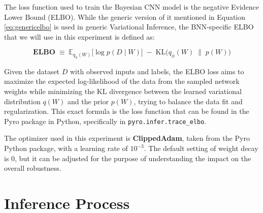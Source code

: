 \documentclass[ %
                    author={Revalda Putawara},
                supervisor={Dr. James Pope},
                    degree={MSc},
                     title={Robustness of Bayesian Neural Networks Design Choices Against Weight and Bias Perturbation Induced by Single Event Upsets (SEUs)},
                      type={},
                      year={2025}]{dissertation}
\begin{document}
The loss function used to train the Bayesian CNN model is the negative Evidence Lower Bound (ELBO). While the generic version of it mentioned in Equation \ref{eq:genericelbo} is used in generic Variational Inference, the BNN-specific ELBO that we will use in this experiment is defined as:

\begin{equation}
\textbf{ELBO} \;\equiv\; 
\mathbb{E}_{q_\phi(W)}\big[\log p(D \mid W)\big]
\;-\;
\text{KL}\big(q_\phi(W) \;\|\; p(W)\big)
\label{eq:elbo_bnn}
\end{equation}

Given the dataset $D$ with observed inputs and labels, the ELBO loss aims to maximize the expected log-likelihood of the data from the sampled network weights while minimizing the KL divergence between the learned variational distribution $q(W)$ and the prior $p(W)$, trying to balance the data fit and regularization. This exact formula is the loss function that can be found in the Pyro package in Python, specifically in \texttt{pyro.infer.trace\_elbo}.

The optimizer used in this experiment is \textbf{ClippedAdam}, taken from the Pyro Python package, with a learning rate of $10^{-3}$. The default setting of weight decay is 0, but it can be adjusted for the purpose of understanding the impact on the overall robustness.


\section{Inference Process}

\end{document}
